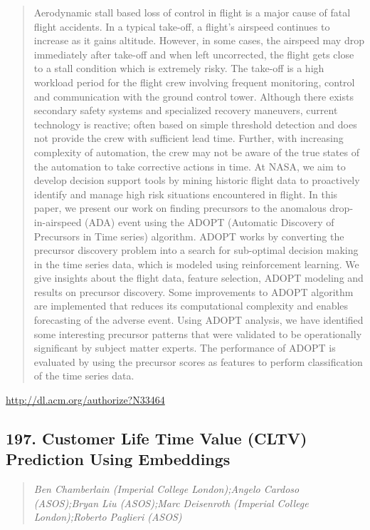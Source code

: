 \documentclass{article}
\begin{document}
\begin{quote}
Aerodynamic stall based loss of control in flight is a major cause of fatal flight accidents. In a typical take-off, a flight’s airspeed continues to increase as it gains altitude. However, in some cases, the airspeed may drop immediately after take-off and when left uncorrected, the flight gets close to a stall condition which is extremely risky. The take-off is a high workload period for the flight crew involving frequent monitoring, control and communication with the ground control tower. Although there exists secondary safety systems and specialized recovery maneuvers, current technology is reactive; often based on simple threshold detection and does not provide the crew with sufficient lead time. Further, with increasing complexity of automation, the crew may not be aware of the true states of the automation to take corrective actions in time. At NASA, we aim to develop decision support tools by mining historic flight data to proactively identify and manage high risk situations encountered in flight. In this paper, we present our work on finding precursors to the anomalous drop-in-airspeed (ADA) event using the ADOPT (Automatic Discovery of Precursors in Time series) algorithm. ADOPT works by converting the precursor discovery problem into a search for sub-optimal decision making in the time series data, which is modeled using reinforcement learning. We give insights about the flight data, feature selection, ADOPT modeling and results on precursor discovery. Some improvements to ADOPT algorithm are implemented that reduces its computational complexity and enables forecasting of the adverse event. Using ADOPT analysis, we have identified some interesting precursor patterns that were validated to be operationally significant by subject matter experts. The performance of ADOPT is evaluated by using the precursor scores as features to perform classification of the time series data.
\end{quote}

\href{http://dl.acm.org/authorize?N33464}{http://dl.acm.org/authorize?N33464}

\subsection{197. Customer Life Time Value (CLTV) Prediction Using Embeddings}

\begin{quote}
\footnotesize{\textit{Ben Chamberlain (Imperial College London);Angelo Cardoso (ASOS);Bryan Liu (ASOS);Marc Deisenroth (Imperial College London);Roberto Paglieri (ASOS)}}

\end{quote}
\end{document}

